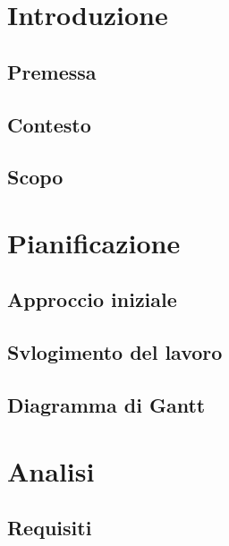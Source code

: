 \documentclass[twoside]{supsistudent}
\begin{document}
\chapter{Introduzione}

\section{Premessa}

\section{Contesto}

\section{Scopo}

\chapter{Pianificazione}

\section{Approccio iniziale}

\section{Svlogimento del lavoro}

\section{Diagramma di Gantt}

\chapter{Analisi}

\section{Requisiti}
\end{document}
